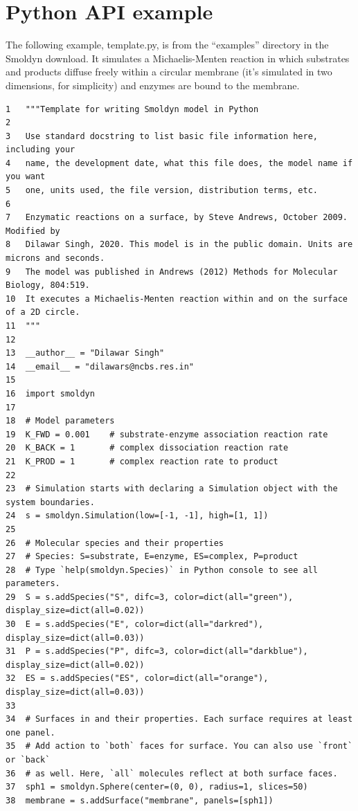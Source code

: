 \documentclass {book}
\begin{document}
\section{Python API example}

The following example, template.py, is from the ``examples'' directory in the Smoldyn download. It simulates a Michaelis-Menten reaction in which substrates and products diffuse freely within a circular membrane (it's simulated in two dimensions, for simplicity) and enzymes are bound to the membrane.

\begin{lstlisting}[style=SSAPython]
1   """Template for writing Smoldyn model in Python
2   
3   Use standard docstring to list basic file information here, including your
4   name, the development date, what this file does, the model name if you want
5   one, units used, the file version, distribution terms, etc.
6   
7   Enzymatic reactions on a surface, by Steve Andrews, October 2009. Modified by
8   Dilawar Singh, 2020. This model is in the public domain. Units are microns and seconds.
9   The model was published in Andrews (2012) Methods for Molecular Biology, 804:519.
10  It executes a Michaelis-Menten reaction within and on the surface of a 2D circle.
11  """
12   
13  __author__ = "Dilawar Singh"
14  __email__ = "dilawars@ncbs.res.in"
15  
16  import smoldyn 
17  
18  # Model parameters
19  K_FWD = 0.001    # substrate-enzyme association reaction rate
20  K_BACK = 1       # complex dissociation reaction rate
21  K_PROD = 1       # complex reaction rate to product
22   
23  # Simulation starts with declaring a Simulation object with the system boundaries.
24  s = smoldyn.Simulation(low=[-1, -1], high=[1, 1])
25  
26  # Molecular species and their properties
27  # Species: S=substrate, E=enzyme, ES=complex, P=product
28  # Type `help(smoldyn.Species)` in Python console to see all parameters.
29  S = s.addSpecies("S", difc=3, color=dict(all="green"), display_size=dict(all=0.02))
30  E = s.addSpecies("E", color=dict(all="darkred"), display_size=dict(all=0.03))
31  P = s.addSpecies("P", difc=3, color=dict(all="darkblue"), display_size=dict(all=0.02))
32  ES = s.addSpecies("ES", color=dict(all="orange"), display_size=dict(all=0.03))
33  
34  # Surfaces in and their properties. Each surface requires at least one panel.
35  # Add action to `both` faces for surface. You can also use `front` or `back`
36  # as well. Here, `all` molecules reflect at both surface faces.
37  sph1 = smoldyn.Sphere(center=(0, 0), radius=1, slices=50)
38  membrane = s.addSurface("membrane", panels=[sph1])

\end{lstlisting}
\end{document}
